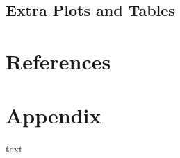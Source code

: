 \documentclass[11pt, a4paper]{article}
\begin{document}
\subsection{Extra Plots and Tables}





































\pagebreak
\section{References}



\renewcommand{\bibsection}{}




\pagebreak
\appendix
\section{Appendix}
\par
text
\end{document}
